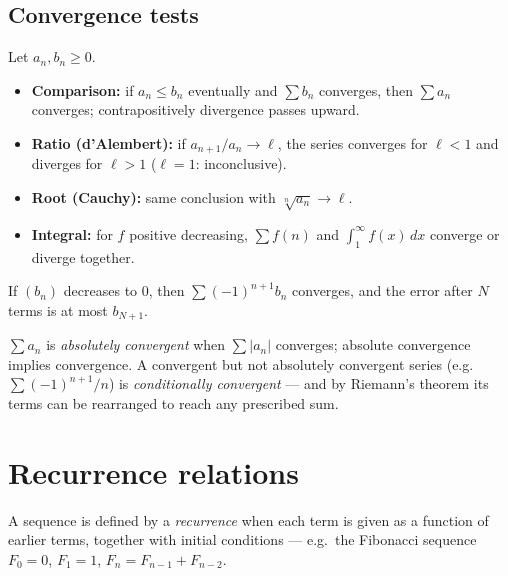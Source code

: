 \subsection{Convergence tests}

\begin{theorem}\label{thm:tests}
Let $a_n, b_n \geq 0$.
\begin{itemize}
\item \textbf{Comparison:} if $a_n \leq b_n$ eventually and $\sum b_n$
  converges, then $\sum a_n$ converges; contrapositively divergence passes
  upward.
\item \textbf{Ratio (d'Alembert):} if $a_{n+1}/a_n \to \ell$, the series
  converges for $\ell < 1$ and diverges for $\ell > 1$ ($\ell = 1$:
  inconclusive).
\item \textbf{Root (Cauchy):} same conclusion with $\sqrt[n]{a_n} \to \ell$.
\item \textbf{Integral:} for $f$ positive decreasing, $\sum f(n)$ and
  $\int_1^{\infty} f(x)\,dx$ converge or diverge together.
\end{itemize}
\end{theorem}

\begin{theorem}
If $(b_n)$ decreases to $0$, then $\sum (-1)^{n+1} b_n$ converges, and the
error after $N$ terms is at most $b_{N+1}$.
\end{theorem}

\begin{definition}
$\sum a_n$ is \emph{absolutely convergent} when $\sum |a_n|$ converges;
absolute convergence implies convergence. A convergent but not absolutely
convergent series (e.g.\ $\sum (-1)^{n+1}/n$) is \emph{conditionally
convergent} --- and by Riemann's theorem its terms can be rearranged to reach
any prescribed sum.
\end{definition}

\section{Recurrence relations}

\begin{definition}
A sequence is defined by a \emph{recurrence} when each term is given as a
function of earlier terms, together with initial conditions --- e.g.\ the
Fibonacci sequence $F_0 = 0$, $F_1 = 1$, $F_{n} = F_{n-1} + F_{n-2}$.
\end{definition}

